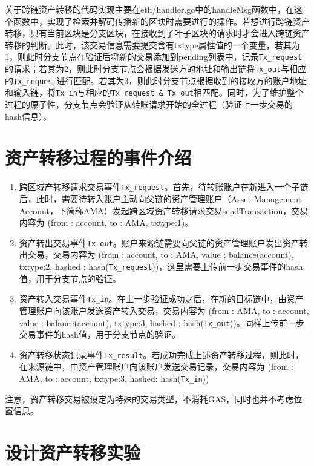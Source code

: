 关于跨链资产转移的代码实现主要在eth/handler.go中的handleMsg函数中，在这个函数中，实现了检索并解码传播新的区块时需要进行的操作。若想进行跨链资产转移，只有当前区块是分支区块，在接收到了叶子区块的请求时才会进入跨链资产转移的判断。此时，该交易信息需要提交含有txtype属性值的一个变量，若其为1，则此时分支节点在验证后将新的交易添加到pending列表中，记录\verb|Tx_request|的请求；若其为2，则此时分支节点会根据发送方的地址和输出链将\verb|Tx_out|与相应的\verb|Tx_request|进行匹配。若其为3，则此时分支节点根据收到的接收方的账户地址和输入链，将\verb|Tx_in|与相应的\verb|Tx_request & Tx_out|相匹配。同时，为了维护整个过程的原子性，分支节点会验证从转账请求开始的全过程（验证上一步交易的hash信息）。

\section{资产转移过程的事件介绍}

\begin{enumerate}
    \item 跨区域产转移请求交易事件\verb|Tx_request|。首先，待转账账户在新进入一个子链后，此时，需要待转入账户主动向父链的资产管理账户（Asset Management Account，下简称AMA）发起跨区域资产转移请求交易sendTransaction，交易内容为 (from : account, to : AMA, txtype:1)。
    \item 资产转出交易事件\verb|Tx_out|。账户来源链需要向父链的资产管理账户发出资产转出交易，交易内容为 (from : account, to : AMA, value : balance(account), txtype:2, hashed : hash(\verb|Tx_request|))，这里需要上传前一步交易事件的hash值，用于分支节点的验证。
    \item 资产转入交易事件\verb|Tx_in|。在上一步验证成功之后，在新的目标链中，由资产管理账户向该账户发送资产转入交易，交易内容为 (from : AMA, to : account, value : balance(account), txtype:3, hashed : hash(\verb|Tx_out|))。同样上传前一步交易事件的hash值，用于分支节点的验证。
    \item 资产转移状态记录事件\verb|Tx_result|。若成功完成上述资产转移过程，则此时，在来源链中，由资产管理账户向该账户发送交易记录，交易内容为 (from : AMA, to : account, txtype:3, hashed: hash(\verb|Tx_in|))
\end{enumerate}

注意，资产转移交易被设定为特殊的交易类型，不消耗GAS，同时也并不考虑位置信息。

\section{设计资产转移实验}


